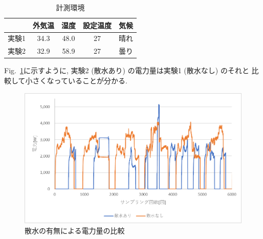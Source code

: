 \documentclass[a4j,fleqn,dvipdfmx,uplatex]{jsarticle}
\newcommand{\figref}[1]{Fig.\ \ref{#1}}
\begin{document}
\begin{table}[hhtb]
  \caption{計測環境}
  \label{table:ex1}
  \centering
  \begin{tabular}{lcccc}
     & 外気温 & 湿度 & 設定温度 & 気候 \\
    \hline \hline
    実験1 & 34.3 & 48.0 & 27 & 晴れ  \\
    実験2 & 32.9 & 58.9 & 27 & 曇り \\
    \hline
  \end{tabular}
\end{table}

\figref{fig1:compare_watering}に示すように, 実験2 (散水あり) の電力量は実験1 (散水なし) のそれと
比較して小さくなっていることが分かる.

\begin{figure}[hhtb]
  \centering
      \includegraphics[width=\linewidth]{img/ex1.png}
      \caption{散水の有無による電力量の比較}
      \label{fig1:compare_watering}
\end{figure}


\end{document}
